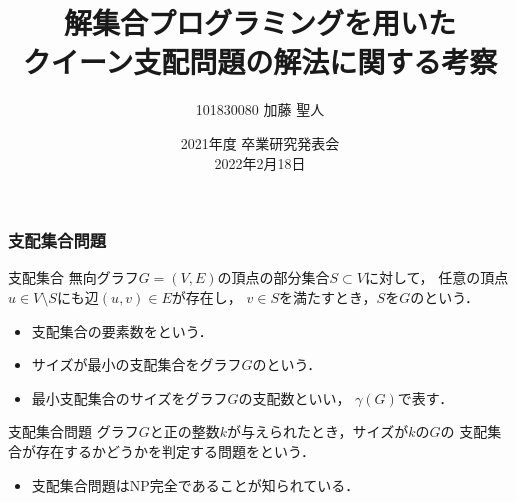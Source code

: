 \documentclass[dvipdfmx,10pt]{beamer}
\begin{document}
\title{解集合プログラミングを用いた\\クイーン支配問題の解法に関する考察}
\author{101830080 \quad 加藤 聖人}
\date{2021年度 卒業研究発表会 \\ 2022年2月18日}

%
%

\begin{frame}\frametitle{}
 \titlepage
\end{frame}

%
%

\begin{frame}\frametitle{支配集合問題}
 \begin{block}{支配集合}
  無向グラフ$G=(V,E)$の頂点の部分集合$S\subset V$に対して，
任意の頂点$u \in V\setminus S$にも辺$(u,v) \in E$が存在し，
$v \in S$を満たすとき，$S$を$G$のという．
  \begin{itemize}
   \item 支配集合の要素数をという．
   \item サイズが最小の支配集合をグラフ$G$のという．
   \item 最小支配集合のサイズをグラフ$G$の\alert{支配数}といい，
$\gamma(G)$で表す．
  \end{itemize}
 \end{block}
 \begin{block}{支配集合問題}
  グラフ$G$と正の整数$k$が与えられたとき，サイズが$k$の$G$の
支配集合が存在するかどうかを判定する問題をという．
  \begin{itemize}
   \item 支配集合問題はNP完全であることが知られている．
  \end{itemize}
 \end{block}
\end{frame}

%
%
\end{document}
